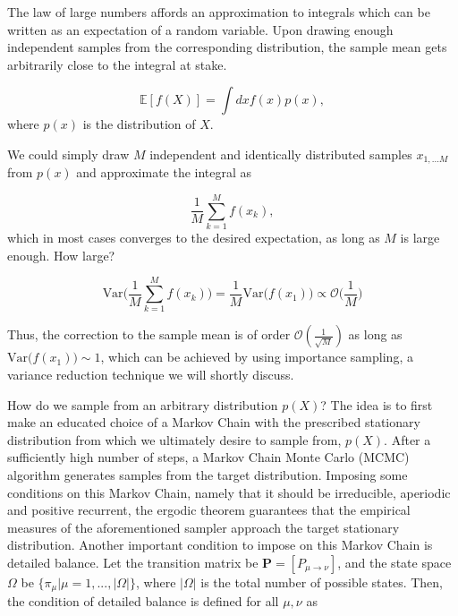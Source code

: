The law of large numbers affords an approximation to integrals which can be written as an expectation of a random variable. Upon drawing enough independent samples from the corresponding distribution, the sample mean gets arbitrarily close to the integral at stake.

\begin{equation}\label{eq:int_mean}
\mathbb{E} [f(X)] = \int dx f(x) p(x),
\end{equation}
where $p(x)$ is the distribution of $X$. 

We could simply draw $M$ independent and identically distributed samples $x_{1,...M}$ from $p(x)$ and approximate the integral as

\begin{equation}
\frac{1}{M} \sum_{k=1}^M f (x_k) , 
\end{equation}
which in most cases converges to the desired expectation, as long as $M$ is large enough. How large?

\begin{equation}\label{eq:variance}
\text{Var}\bigg( \frac{1}{M} \sum_{k=1}^M f(x_k) \bigg) = \frac{1}{M} \text{Var}\bigg( f(x_1) \bigg) \propto \mathcal{O}\bigg(\frac{1}{M}\bigg)
\end{equation}

Thus, the correction to the sample mean is of order $\mathcal{O}(\frac{1}{\sqrt{M}})$ as long as $\text{Var}\big( f(x_1) \big) \sim 1$, which can be achieved by using importance sampling, a variance reduction technique we will shortly discuss.

How do we sample from an arbitrary distribution $p(X)$? The idea is to first make an educated choice of a Markov Chain with the prescribed stationary distribution from which we ultimately desire to sample from, $p(X)$. After a sufficiently high number of steps, a Markov Chain Monte Carlo (MCMC) algorithm generates samples from the target distribution. Imposing some conditions on this Markov Chain, namely that it should be irreducible, aperiodic and positive recurrent, the ergodic theorem guarantees that the empirical measures of the aforementioned sampler approach the target stationary distribution. Another important condition to impose on this Markov Chain is detailed balance. Let the transition matrix be $\bm P = [P_{\mu \rightarrow \nu}]$, and the state space $\Omega$ be $\{\pi_\mu | \mu=1, ..., |\Omega| \}$, where $|\Omega|$ is the total number of possible states. Then, the condition of detailed balance is defined for all $\mu, \nu$ as

